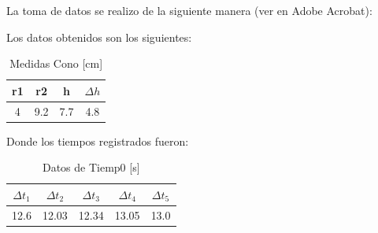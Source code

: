 La toma de datos se realizo de la siguiente manera (ver en Adobe Acrobat):

\begin{center}
\end{center}

\newpage
Los datos obtenidos son los siguientes:

\begin{table}[H]
    \centering
    \begin{tabular}{|c|c|c|c|}
    \hline
    r1 & r2 & h & $\Delta h$ \\ \hline
    4 & 9.2 & 7.7 & 4.8 \\ \hline
    \end{tabular}
    \caption{Medidas Cono [cm]}
    \label{tab:permeabilidad}
\end{table}

Donde los tiempos registrados fueron:

\begin{table}[H]
    \centering
    \begin{tabular}{|c|c|c|c|c|}
    \hline
    $\Delta t_1$ & $\Delta t_2$ & $\Delta t_3$ & $\Delta t_4$ & $\Delta t_5$ \\ \hline
    12.6 & 12.03 & 12.34 & 13.05 & 13.0 \\ \hline
    \end{tabular}
    \caption{Datos de Tiemp0 [s]}
    \label{tab:tiempos}
\end{table}

